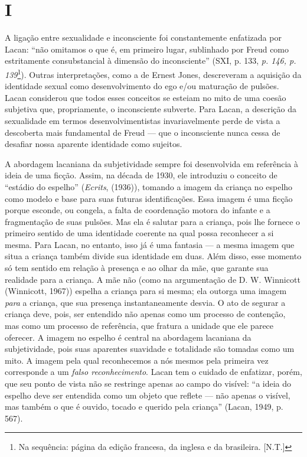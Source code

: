 \section{I}

A ligação entre sexualidade e inconsciente foi constantemente enfatizada
por Lacan: ``não omitamos o que é, em primeiro lugar, sublinhado por
Freud como estritamente consubstancial à dimensão do inconsciente''
(SXI, p. 133, \emph{p. 146, p. 139}\footnote{Na sequência: página da
  edição francesa, da inglesa e da brasileira. {[}N.T.{]}}). Outras
interpretações, como a de Ernest Jones, descreveram a aquisição da
identidade sexual como desenvolvimento do ego e/ou maturação de pulsões.
Lacan considerou que todos esses conceitos se esteiam no mito de uma
coesão subjetiva que, propriamente, o inconsciente subverte. Para Lacan,
a descrição da sexualidade em termos desenvolvimentistas invariavelmente
perde de vista a descoberta mais fundamental de Freud --- que o
inconsciente nunca cessa de desafiar nossa aparente identidade como
sujeitos.

A abordagem lacaniana da subjetividade sempre foi desenvolvida em
referência à ideia de uma ficção. Assim, na década de 1930, ele
introduziu o conceito de ``estádio do espelho'' (\emph{Ecrits}, (1936)),
tomando a imagem da criança no espelho como modelo e base para suas
futuras identificações. Essa imagem é uma ficção porque esconde, ou
congela, a falta de coordenação motora do infante e a fragmentação de
suas pulsões. Mas ela é salutar para a criança, pois lhe fornece o
primeiro sentido de uma identidade coerente na qual possa reconhecer a
si mesma. Para Lacan, no entanto, isso já é uma fantasia --- a mesma
imagem que situa a criança também divide sua identidade em duas. Além
disso, esse momento só tem sentido em relação à presença e ao olhar da
mãe, que garante sua realidade para a criança. A mãe não (como na
argumentação de D. W. Winnicott (Winnicott, 1967)) espelha a criança
para si mesma; ela outorga uma imagem \emph{para} a criança, que sua
presença instantaneamente desvia. O ato de segurar a criança deve, pois,
ser entendido não apenas como um processo de contenção, mas como um
processo de referência, que fratura a unidade que ele parece oferecer. A
imagem no espelho é central na abordagem lacaniana da subjetividade,
pois suas aparentes suavidade e totalidade são tomadas como um mito. A
imagem pela qual reconhecemos a nós mesmos pela primeira vez corresponde
a um \emph{falso reconhecimento}. Lacan tem o cuidado de enfatizar,
porém, que seu ponto de vista não se restringe apenas ao campo do
visível: ``a ideia do espelho deve ser entendida como um objeto que
reflete --- não apenas o visível, mas também o que é ouvido, tocado e
querido pela criança'' (Lacan, 1949, p. 567).

